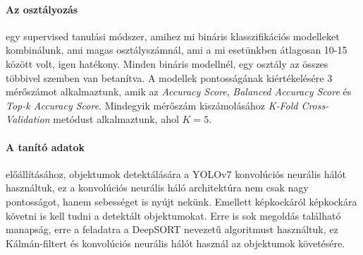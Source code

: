 \documentclass[12pt,a4paper]{article}
\begin{document}
\paragraph{Az osztályozás} egy supervised tanulási módszer, amihez mi bináris klasszifikációs modelleket kombinálunk, ami magas osztályszámnál, ami a mi esetünkben átlagosan 10-15 között volt, igen hatékony. Minden bináris modellnél, egy osztály az összes többivel szemben van betanítva. A modellek pontosságának kiértékelésére 3 mérőszámot alkalmaztunk, amik az \emph{Accuracy Score}, \emph{Balanced Accuracy Score} \cite{10.1109/ICPR.2010.764} és \emph{Top-k Accuracy Score}.
Mindegyik mérőszám kiszámolásához \emph{K-Fold Cross-Validation} \cite{Anguita2012TheI} metódust alkalmaztunk, ahol \begin{math}K=5\end{math}.


\paragraph{A tanító adatok} előállításához, objektumok detektálására a YOLOv7 \cite{wang2022yolov7} konvolúciós neurális hálót használtuk, ez a konvolúciós neurális háló architektúra nem csak nagy pontosságot, hanem sebességet is nyújt nekünk.
Emellett képkockáról képkockára követni is kell tudni a detektált objektumokat. Erre is sok megoldás található manapság, erre a feladatra
a DeepSORT \cite{Wojke2018deep} nevezetű algoritmust használtuk, ez Kálmán-filtert és konvolúciós neurális hálót használ az objektumok követésére.
\end{document}
